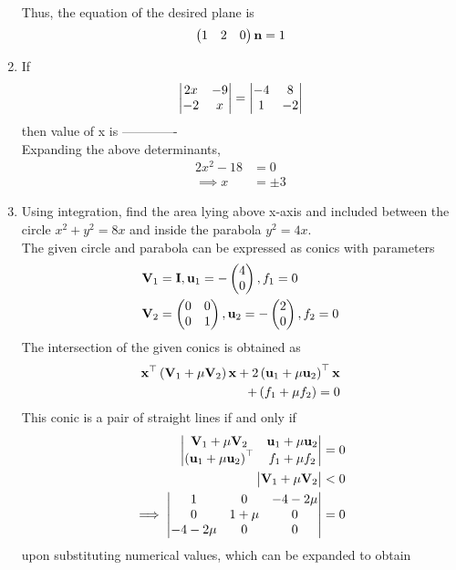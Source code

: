 \documentclass[journal,12pt,twocolumn]{IEEEtran}
\renewcommand\thesection{\arabic{section}}
\begin{document}
\begin{enumerate}[label=\thesection.\arabic*.,ref=\thesection.\theenumi]
\begin{align}
  \end{align}
  Thus, the equation of the desired plane is 
\begin{align}
\begin{pmatrix}1 & 2 & 0\end{pmatrix} \mathbf{n} = 1
  \end{align}
\item  If \begin{align} \begin{vmatrix}2x & -9 \\ -2 & x\end{vmatrix}  = \begin{vmatrix}-4 & 8 \\ 1 & -2 \end{vmatrix} \nonumber \end{align} then value of x is -------------\\
\solution
		Expanding the above determinants,
\begin{align}
	2x^2 - 18 &= 0
	\\
	\implies x &= \pm 3
\end{align}
 \item Using integration, find the area lying above x-axis and included between the circle $ x^2 + y^2 =8x $ and inside the parabola $ y^2 =4x $.   
	 \\
	 \solution The given circle and parabola can be expressed as conics with parameters
\begin{align}
	\mathbf{V}_1 &= \mathbf{I}, \mathbf{u}_1 = -\begin{pmatrix}4 \\0\end{pmatrix}, f_1 = 0
	\\
	\mathbf{V}_2 &= \begin{pmatrix} 0 & 0 \\ 0 & 1\end{pmatrix}, \mathbf{u}_2 = -\begin{pmatrix}2 \\0\end{pmatrix}, f_2 = 0
    \end{align}
    The intersection of the given conics is obtained as 
\begin{align}
	\mathbf{x}^{\top}\left(\mathbf{V}_1 + \mu\mathbf{V}_2\right)\mathbf{x}+2 \left(\mathbf{u}_1+\mu \mathbf{u}_2\right)^{\top} \mathbf{x} 
	\\
	+ \left(f_1+\mu f_2\right)= 0
    \end{align}
    This conic is a pair of straight lines if  and only if 
\begin{align}
	\begin{vmatrix}\mathbf{V}_1 + \mu\mathbf{V}_2 & \mathbf{u}_1+\mu \mathbf{u}_2\\ \left(\mathbf{u}_1+\mu \mathbf{u}_2\right)^{\top} & f_1 + \mu f_2\end{vmatrix} &= 0
	\\
	\label{eq:conic-pair}
	\begin{vmatrix}\mathbf{V}_1 + \mu\mathbf{V}_2\end{vmatrix} &< 0
\\
	\implies 	\begin{vmatrix}1 & 0 & -4-2\mu\\ 0 & 1+\mu & 0 \\ -4 - 2\mu & 0 & 0\end{vmatrix} &= 0
    \end{align}
    upon substituting numerical values, which can be expanded to obtain 

\end{enumerate}
\end{document}

